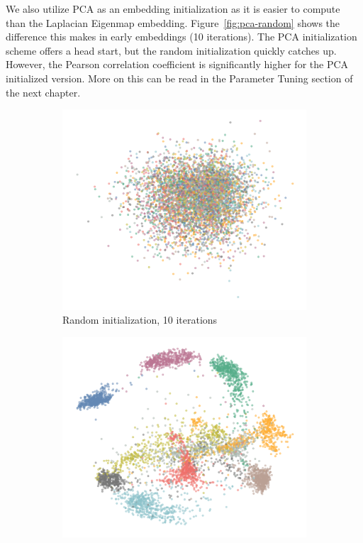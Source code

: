 We also utilize PCA as an embedding initialization as it is easier to compute
than the Laplacian Eigenmap embedding.  Figure~\ref{fig:pca-random} shows the
difference this makes in early embeddings (10 iterations). The PCA
initialization scheme offers a head start, but the random initialization
quickly catches up. However, the Pearson correlation coefficient is
significantly higher for the PCA initialized version.  More on this can be read
in the Parameter Tuning section of the next chapter.

\begin{figure}[tbp]
  \centering
  \begin{subfigure}{.45\linewidth}
    \centering
    \includegraphics[width=\linewidth]{img/random_10_iters-1}
    \caption{Random initialization, 10 iterations}
  \end{subfigure}
  \begin{subfigure}{.45\linewidth}
    \centering
    \includegraphics[width=\linewidth]{img/pca_10_iters-1}

\end{subfigure}
\end{figure}

